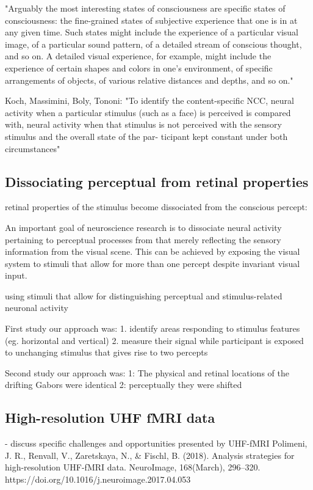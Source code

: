 "Arguably the most interesting states of consciousness are specific states of consciousness: the fine-grained states of subjective experience that one is in at any given time. Such states might include the experience of a particular visual image, of a particular sound pattern, of a detailed stream of conscious thought, and so on. A detailed visual experience, for example, might include the experience of certain shapes and colors in one’s environment, of specific arrangements of objects, of various relative distances and depths, and so on."

Koch, Massimini, Boly, Tononi:
"To identify the content-specific NCC, neural activity when a particular stimulus (such as a face) is perceived is compared with,
neural activity when that stimulus is not perceived with the sensory stimulus and the overall state of the par- ticipant kept constant under both circumstances"


\subsection{Dissociating perceptual from retinal properties}
retinal properties of the stimulus become dissociated from the conscious percept:

An important goal of neuroscience research is to dissociate neural activity pertaining to perceptual processes from that merely reflecting the sensory information from the visual scene. This can be
achieved by exposing the visual system to stimuli that allow for more than one percept despite invariant visual input.

using stimuli that allow for distinguishing perceptual and stimulus-related neuronal activity

First study our approach was:
1. identify areas responding to stimulus features (eg. horizontal and vertical)
2. measure their signal while participant is exposed to unchanging stimulus that gives rise to two percepts

Second study our approach was:
1: The physical and retinal locations of the drifting Gabors were identical
2: perceptually they were shifted

\subsection{High-resolution UHF fMRI data}
- discuss specific challenges and opportunities presented by UHF-fMRI
Polimeni, J. R., Renvall, V., Zaretskaya, N., & Fischl, B. (2018). Analysis strategies for high-resolution UHF-fMRI data. NeuroImage, 168(March), 296–320. https://doi.org/10.1016/j.neuroimage.2017.04.053

